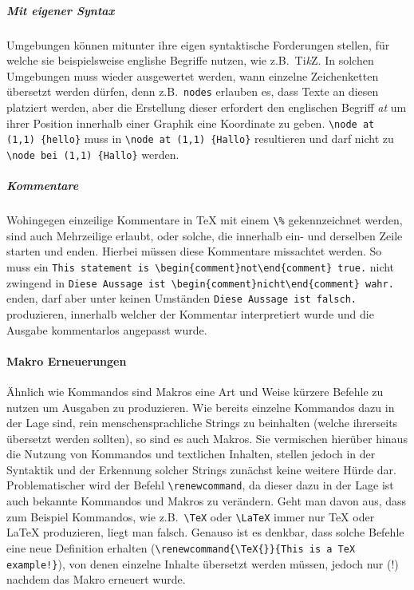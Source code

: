 \subparagraph*{Mit eigener Syntax}\par
Umgebungen können mitunter ihre eigen syntaktische Forderungen stellen, für welche sie beispielsweise englishe Begriffe nutzen, wie z.B.\ Ti\textit{k}Z. In solchen Umgebungen muss wieder ausgewertet werden, wann einzelne Zeichenketten übersetzt werden dürfen, denn z.B.\ \texttt{nodes} erlauben es, dass Texte an diesen platziert werden, aber die Erstellung dieser erfordert den englischen Begriff \textit{at} um ihrer Position innerhalb einer Graphik eine Koordinate zu geben.
\verb|\node at (1,1) {hello}| muss in \verb|\node at (1,1) {Hallo}| resultieren und darf nicht zu \verb|\node bei (1,1) {Hallo}| werden. 

\subparagraph*{Kommentare}\par
Wohingegen einzeilige Kommentare in \TeX{} mit einem \verb"\%" gekennzeichnet werden, sind auch Mehrzeilige erlaubt, oder solche, die innerhalb ein- und derselben Zeile starten und enden. Hierbei müssen diese Kommentare missachtet werden. So muss ein \verb|This statement is \begin{comment}not\end{comment} true.| nicht zwingend in \verb|Diese Aussage ist \begin{comment}nicht\end{comment} wahr.| enden, darf aber unter keinen Umständen \verb|Diese Aussage ist falsch.| produzieren, innerhalb welcher der Kommentar interpretiert wurde und die Ausgabe kommentarlos angepasst wurde.

\paragraph*{Makro Erneuerungen}\par
Ähnlich wie Kommandos sind Makros eine Art und Weise kürzere Befehle zu nutzen um Ausgaben zu produzieren.%
Wie bereits einzelne Kommandos dazu in der Lage sind, rein menschensprachliche Strings zu beinhalten (welche ihrerseits übersetzt werden sollten), so sind es auch Makros. Sie vermischen hierüber hinaus die Nutzung von Kommandos und textlichen Inhalten, stellen jedoch in der Syntaktik und der Erkennung solcher Strings zunächst keine weitere Hürde dar. Problematischer wird der Befehl \verb|\renewcommand|, da dieser dazu in der Lage ist auch bekannte Kommandos und Makros zu verändern. Geht man davon aus, dass zum Beispiel Kommandos, wie z.B.\ \verb|\TeX| oder \verb|\LaTeX| immer nur \TeX{} oder \LaTeX{} produzieren, liegt man falsch. Genauso ist es denkbar, dass solche Befehle eine neue Definition erhalten (\verb|\renewcommand{\TeX{}}{This is a TeX example!}|), von denen einzelne Inhalte übersetzt werden müssen, jedoch nur (!) nachdem das Makro erneuert wurde.

